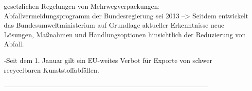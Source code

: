 gesetzlichen Regelungen von Mehrwegverpackungen:
-Abfallvermeidungsprogramm der Bundesregierung sei 2013
--> Seitdem entwickelt das Bundesumweltministerium auf Grundlage aktueller Erkenntnisse neue Lösungen, Maßnahmen und Handlungsoptionen hinsichtlich der Reduzierung von Abfall.

-Seit dem 1. Januar gilt ein EU-weites Verbot für Exporte von schwer recycelbaren Kunststoffabfällen.






------------------------------------------------------------------------------------------
        
        






